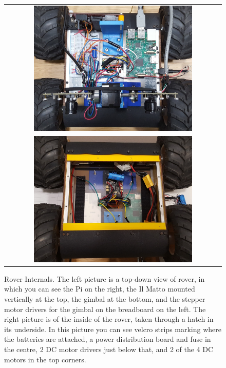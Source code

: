 \begin{figure}[H]
    \begin{center}
    \begin{tabular}{ c }
        \includegraphics[width=0.75\textwidth]{Figures/rovertop.jpg} \\
        \includegraphics[width=0.75\textwidth]{Figures/roverinside.jpg}
    \end{tabular}
    \caption[Rover Internals]{Rover Internals. The left picture is a top-down view of rover, in which you can see the Pi on the right, the Il Matto mounted vertically at the top, the gimbal at the bottom, and the stepper motor drivers for the gimbal on the breadboard on the left. The right picture is of the inside of the rover, taken through a hatch in its underside. In this picture you can see velcro strips marking where the batteries are attached, a power distribution board and fuse in the centre, 2 DC motor drivers just below that, and 2 of the 4 DC motors in the top corners.}
    \label{fig:internals}
    \end{center}
\end{figure}

